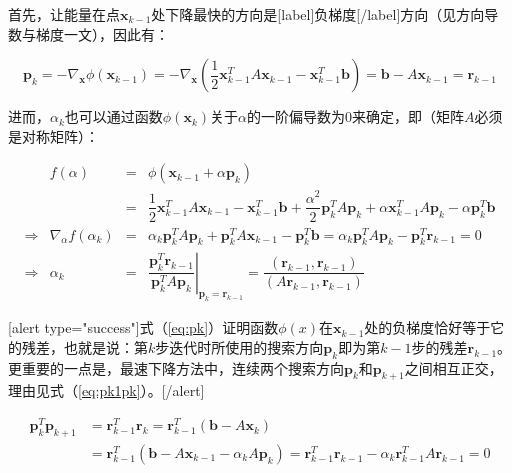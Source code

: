 \documentclass[UTF8,nofonts]{ctexart}
\begin{document}
首先，让能量在点$\boldsymbol{x}_{k-1}$处下降最快的方向是[label]负梯度[/label]方向（见方向导数与梯度一文），因此有：

\begin{equation}
	\label{eq:pk}
	\boldsymbol{p}_k = -\nabla_{\boldsymbol{x}}\phi(\boldsymbol{x}_{k-1}) =
	-\nabla_{\boldsymbol{x}}\left(
		\dfrac{1}{2}\boldsymbol{x}_{k-1}^TA\boldsymbol{x}_{k-1}-\boldsymbol{x}_{k-1}^T\boldsymbol{b}
	\right)=\boldsymbol{b}-A\boldsymbol{x}_{k-1} = \boldsymbol{r}_{k-1}
\end{equation}

进而，$\alpha_k$也可以通过函数$\phi(\boldsymbol{x}_{k})$关于$\alpha$的一阶偏导数为$0$来确定，即（矩阵$A$必须是对称矩阵）：

\begin{equation}
	\label{eq:alpha}
	\begin{array}{rrcl}
		& f(\alpha) & = & \phi(\boldsymbol{x}_{k-1}+\alpha\boldsymbol{p}_k) \\
		& & = & \dfrac{1}{2}\boldsymbol{x}^T_{k-1}A\boldsymbol{x}_{k-1}-
			\boldsymbol{x}^T_{k-1}\boldsymbol{b}+
			\dfrac{\alpha^2}{2}\boldsymbol{p}^T_kA\boldsymbol{p}_k+
			\alpha\boldsymbol{x}_{k-1}^TA\boldsymbol{p}_k-
			\alpha\boldsymbol{p}_k^T\boldsymbol{b} \\
		\Longrightarrow & \nabla_{\alpha}f(\alpha_k) & = &
			\alpha_k\boldsymbol{p}_k^TA\boldsymbol{p}_k+
			\boldsymbol{p}^T_kA\boldsymbol{x}_{k-1}-
			\boldsymbol{p}_k^T\boldsymbol{b} =
			\alpha_k\boldsymbol{p}_k^TA\boldsymbol{p}_k-
			\boldsymbol{p}_k^T\boldsymbol{r}_{k-1} = 0 \\
		\Longrightarrow & \alpha_k & = &
			\left.
				\dfrac{\boldsymbol{p}_k^T\boldsymbol{r}_{k-1}}{
					\boldsymbol{p}_k^TA\boldsymbol{p}_k}
			\right|_{\boldsymbol{p}_k=\boldsymbol{r}_{k-1}} =
			\dfrac{(\boldsymbol{r}_{k-1},\boldsymbol{r}_{k-1})}{
				(A\boldsymbol{r}_{k-1},\boldsymbol{r}_{k-1})}
	\end{array}
\end{equation}

[alert type="success"]式（\ref{eq:pk}）证明函数$\phi(x)$在$\boldsymbol{x}_{k-1}$处的负梯度恰好等于它的残差，也就是说：第$k$步迭代时所使用的搜索方向$\boldsymbol{p}_k$即为第$k-1$步的残差$\boldsymbol{r}_{k-1}$。更重要的一点是，最速下降方法中，连续两个搜索方向$\boldsymbol{p}_{k}$和$\boldsymbol{p}_{k+1}$之间相互正交，理由见式（\ref{eq:pk1pk}）。[/alert]

\begin{equation}
	\label{eq:pk1pk}
	\begin{aligned}
		\boldsymbol{p}_{k}^T\boldsymbol{p}_{k+1} &=
		\boldsymbol{r}_{k-1}^T\boldsymbol{r}_{k}=\boldsymbol{r}_{k-1}^T(\boldsymbol{b}-A\boldsymbol{x}_{k}) \\
		&= \boldsymbol{r}_{k-1}^T(\boldsymbol{b}-A\boldsymbol{x}_{k-1}-\alpha_kA\boldsymbol{p}_k)=\boldsymbol{r}_{k-1}^T\boldsymbol{r}_{k-1}-\alpha_k\boldsymbol{r}_{k-1}^TA\boldsymbol{r}_{k-1}=0
	\end{aligned}
\end{equation}
\end{document}
